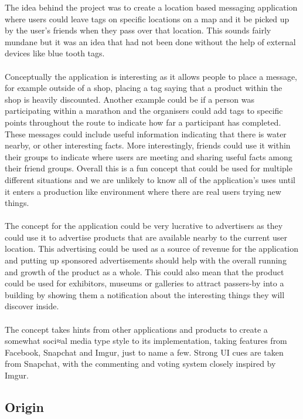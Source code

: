 The idea behind the project was to create a location based messaging application where users could leave tags on specific locations on a map and it be picked up by the user's friends when they pass over that location. This sounds fairly mundane but it was an idea that had not been done without the help of external devices like blue tooth tags.\\
\\
Conceptually the application is interesting as it allows people to place a message, for example outside of a shop, placing a tag saying that a product within the shop is heavily discounted. Another example could be if a person was participating within a marathon and the organisers could add tags to specific points throughout the route to indicate how far a participant has completed. These messages could include useful information indicating that there is water nearby, or other interesting facts. More interestingly, friends could use it within their groups to indicate where users are meeting and sharing useful facts among their friend groups. Overall this is a fun concept that could be used for multiple different situations and we are unlikely to know all of the application's uses until it enters a production like environment where there are real users trying new things.\\
\\
The concept for the application could be very lucrative to advertisers as they could use it to advertise products that are available nearby to the current user location. This advertising could be used as a source of revenue for the application and putting up sponsored advertisements should help with the overall running and growth of the product as a whole. This could also mean that the product could be used for exhibitors, museums or galleries to attract passers-by into a building by showing them a notification about the interesting things they will discover inside.\\
\\
The concept takes hints from other applications and products to create a somewhat soci≈al media type style to its implementation, taking features from Facebook, Snapchat and Imgur, just to name a few. Strong UI cues are taken from Snapchat, with the commenting and voting system closely inspired by Imgur.

\subsection{Origin}
\label{sec:origin}

